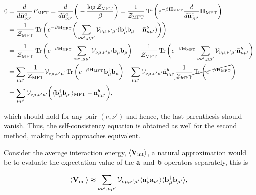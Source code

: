 \documentclass{homework}
\begin{document}
\begin{itemize}
    \begin{equation}
        \begin{split}
            0 &= \frac{d}{d\bar{\bf n}_{\nu \nu'}^{a}} F_{\textnormal{MFT}} = \frac{d}{d\bar{\bf n}_{\nu \nu'}^{a}} \bigg(-\frac{\log \mathcal{Z}_{\textnormal{MFT}}}{\beta}\bigg) = \frac{1}{\mathcal{Z}_{\textnormal{MFT}}} \Tr \bigg(e^{-\beta {\bf H}_{\textnormal{MFT}}} \frac{d}{d\bar{\bf n}_{\nu \nu'}^{a}} {\bf H}_{\textnormal{MFT}} \bigg) \\
            &=\frac{1}{\mathcal{Z}_{\textnormal{MFT}}} \Tr \bigg(e^{-\beta {\bf H}_{\textnormal{MFT}}} \bigg(\sum_{\nu\nu', \mu\mu'} {\mathcal{V}}_{\nu\mu, \nu'\mu'} ({\bf b}_{\mu}^\dagger {\bf b}_\mu - \bar{\bf n}_{\mu\mu'}^{b})\bigg)\bigg) \\
            &= \frac{1}{\mathcal{Z}_{\textnormal{MFT}}} \Tr \bigg(e^{-\beta {\bf H}_{\textnormal{MFT}}} \sum_{\nu\nu', \mu\mu'} {\mathcal{V}}_{\nu\mu, \nu'\mu'} {\bf b}_{\mu}^\dagger {\bf b}_\mu \bigg) - \frac{1}{\mathcal{Z}_{\textnormal{MFT}}} \Tr \bigg(e^{-\beta {\bf H}_{\textnormal{MFT}}} \sum_{\nu\nu', \mu\mu'} {\mathcal{V}}_{\nu\mu, \nu'\mu'}\bar{\bf n}_{\mu\mu'}^{b}\bigg)
            \\
            &= \sum_{\mu \mu'} \frac{1}{\mathcal{Z}_{\textnormal{MFT}}} {\mathcal{V}}_{\nu\mu, \nu'\mu'} \Tr \bigg(e^{-\beta {\bf H}_{\textnormal{MFT}}} {\bf b}_{\mu}^\dagger {\bf b}_\mu \bigg) - \sum_{\mu \mu'} {\mathcal{V}}_{\nu\mu, \nu'\mu'} \bar{\bf n}_{\mu\mu'}^{b} \cancel{\frac{1}{\mathcal{Z}_{\textnormal{MFT}}} \Tr \bigg(e^{-\beta {\bf H}_{\textnormal{MFT}}}}\bigg)\\
            &= \sum_{\mu\mu'} {\mathcal{V}}_{\nu\mu, \nu'\mu'} \bigg(\langle {\bf b}_{\mu}^\dagger {\bf b}_{\mu'} \rangle_{\textnormal{MFT}} - \bar{\bf n}_{\mu\mu'}^{b}\bigg), 
        \end{split}
    \end{equation}
    
    which should hold for any pair $(\nu, \nu')$ and hence, the last parenthesis should vanish. Thus, the self-consistency equation is obtained as well for the second method, making both approaches equivalent. \\
\end{itemize}

Consider the average interaction energy, $\langle {\bf V}_{\textnormal{int}} \rangle$, a natural approximation would be to evaluate the expectation value of the ${\bf a}$ and ${\bf b}$ operators separately, this is 

$$
    \langle {\bf V}_{\textnormal{int}} \rangle \approx \sum_{\nu \nu', \mu \mu'} {\mathcal{V}}_{\nu\mu, \nu'\mu'} \langle {\bf a}_{\nu}^\dagger {\bf a}_{\nu'} \rangle \langle {\bf b}_{\mu}^\dagger {\bf b}_{\mu'} \rangle,
$$
\end{document}
